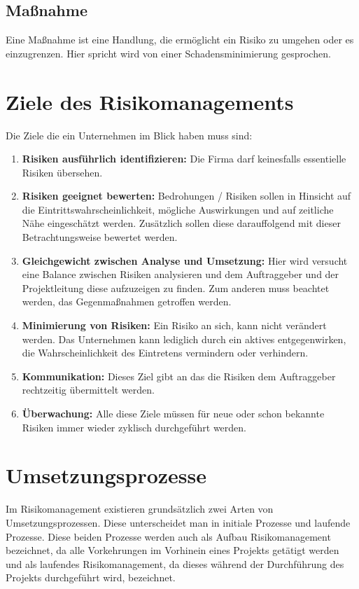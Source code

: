 \subsection{Maßnahme}
Eine Maßnahme ist eine Handlung, die ermöglicht ein Risiko zu umgehen oder es einzugrenzen. Hier spricht wird von einer Schadensminimierung gesprochen. 

\section{Ziele des Risikomanagements}
Die Ziele die ein Unternehmen im Blick haben muss sind:
\begin{enumerate}
	\item \textbf{Risiken ausführlich identifizieren:} Die Firma darf keinesfalls essentielle Risiken übersehen.
	\item \textbf{Risiken geeignet bewerten:} Bedrohungen / Risiken sollen in Hinsicht auf die Eintrittswahrscheinlichkeit, mögliche Auswirkungen und auf zeitliche Nähe eingeschätzt werden. Zusätzlich sollen diese darauffolgend mit dieser Betrachtungsweise bewertet werden.
	\item \textbf{Gleichgewicht zwischen Analyse und Umsetzung:} Hier wird versucht eine Balance zwischen Risiken analysieren und dem Auftraggeber und der Projektleitung diese aufzuzeigen zu finden. Zum anderen muss beachtet werden, das Gegenmaßnahmen getroffen werden.
	\item \textbf{Minimierung von Risiken:} Ein Risiko an sich, kann nicht verändert werden. Das Unternehmen kann lediglich durch ein aktives entgegenwirken, die Wahrscheinlichkeit des Eintretens vermindern oder verhindern.
	\item \textbf{Kommunikation:} Dieses Ziel gibt an das die Risiken dem Auftraggeber rechtzeitig übermittelt werden.
	\item \textbf{Überwachung:} Alle diese Ziele müssen für neue oder schon bekannte Risiken immer wieder zyklisch durchgeführt werden. 
\end{enumerate}

\section{Umsetzungsprozesse}
Im Risikomanagement existieren grundsätzlich zwei Arten von Umsetzungsprozessen. Diese unterscheidet man in initiale Prozesse und laufende Prozesse.
Diese beiden Prozesse werden auch als Aufbau Risikomanagement bezeichnet, da alle Vorkehrungen im Vorhinein eines Projekts getätigt werden und als laufendes Risikomanagement, da dieses während der Durchführung des Projekts durchgeführt wird, bezeichnet.

